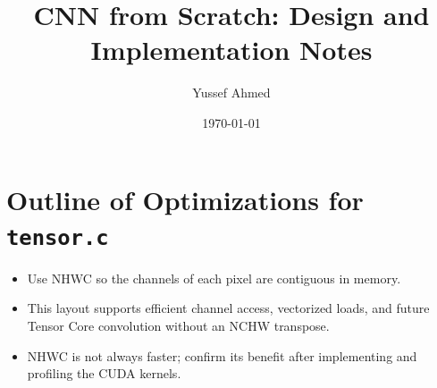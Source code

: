 \documentclass[11pt]{article}
\title{CNN from Scratch: Design and Implementation Notes}
\author{Yussef Ahmed}
\date{\today}
\begin{document}
\maketitle

\section{Outline of Optimizations for \texttt{tensor.c}}

\begin{itemize}
    \item Use NHWC so the channels of each pixel are contiguous in memory.
    \item This layout supports efficient channel access, vectorized loads, and future Tensor Core convolution without an NCHW transpose.
    \item NHWC is not always faster; confirm its benefit after implementing and profiling the CUDA kernels.
\end{itemize}
\end{document}
